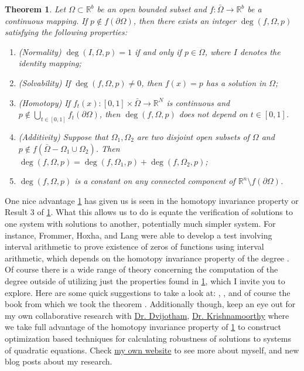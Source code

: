 \documentclass[11pt]{article}
\theoremstyle{plain}
\newtheorem{thm}{Theorem}[section]
\theoremstyle{definition}
\theoremstyle{remark}
\begin{document}
\begin{thm} \label{DegThm}
Let $\Omega\subset\mathbb{R}^b$ be an open bounded subset and $f:\bar{\Omega}\rightarrow\mathbb{R}^b$ be a continuous mapping. If $p\not\in f\left(\partial\Omega\right)$, then there exists an integer $\operatorname{deg}\left(f, \Omega,p\right)$ satisfying the following properties:
\begin{enumerate}
\item (Normality) $\operatorname{deg}\left(I, \Omega,p\right)=1$ if and only if $p\in\Omega$, where $I$ denotes the identity mapping;
\item (Solvability) If $\operatorname{deg}\left(f, \Omega,p\right)\not= 0$, then $f(x)=p$ has a solution in $\Omega$;
\item (Homotopy) If $f_t(x):[0,1]\times\bar{\Omega}\rightarrow\mathbb{R}^N$ is continuous and $p\not\in \bigcup\limits_{t\in[0,1]}f_t\left(\partial\Omega\right)$, then $\operatorname{deg}\left(f, \Omega,p\right)$ does not depend on $t\in[0,1]$. 
\item (Additivity) Suppose that $\Omega_1, \Omega_2$ are two disjoint open subsets of $\Omega$ and $p\not\in f\left(\bar{\Omega}-\Omega_1\cup\Omega_2\right)$. Then $\operatorname{deg}\left(f, \Omega,p\right)=\operatorname{deg}\left(f, \Omega_1,p\right)+\operatorname{deg}\left(f, \Omega_2,p\right)$;
\item $\operatorname{deg}\left(f, \Omega,p\right)$ is a constant on any connected component of $\mathbb{R}^n\setminus f(\partial\Omega)$. 
\end{enumerate}
\end{thm}

One nice advantage \cref{DegThm} has given us is seen in the homotopy invariance property or Result 3 of \cref{DegThm}.
What this allows us to do is equate the verification of solutions to one system with solutions to another, potentially much simpler system.
For instance, Frommer, Hoxha, and Lang were able to develop a test involving interval arithmetic to prove existence of zeros of functions using interval arithmetic, which depends on the homotopy invariance property of the degree \cite{FrHoLa2007}.
Of course there is a wide range of theory concerning the computation of the degree outside of utilizing just the properties found in \cref{DegThm}, which I invite you to explore. 
Here are some quick suggestions to take a look at: \cite{MoVrYa2002}, \cite{OnTh2006}, and of course the book from which we took the theorem \cite{OrChCh2006}. Additionally though, keep an eye out for my own collaborative research with \href{https://dvij.github.io/}{Dr. Dvijotham}, \href{http://www.math.wsu.edu/math/faculty/bkrishna/}{Dr. Krishnamoorthy} where we take full advantage of the homotopy invariance property of  \cref{DegThm} to construct optimization based techniques for calculating robustness of solutions to systems of quadratic equations. Check \href{http://www.benrapone.com/}{my own website} to see more about myself, and new blog posts about my research.

  

\end{document}
